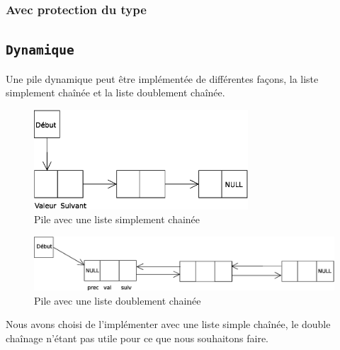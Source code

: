 \subsubsection{Avec protection du type}

\subsection{\texttt{Dynamique}}
Une pile dynamique peut être implémentée de différentes façons, la liste simplement chaînée et la liste doublement chaînée.
\begin{figure}[H]
\centering
\includegraphics[width=8cm]{content/schemas/pile.eps}
\caption{Pile avec une liste simplement chainée}
\end{figure}

\begin{figure}[H]
\centering
\includegraphics[width=16cm]{content/schemas/pileDoubleChaine.eps}
\caption{Pile avec une liste doublement chainée}
\end{figure}

Nous avons choisi de l'implémenter avec une liste simple chaînée, le double chaînage n'étant pas utile pour ce que nous souhaitons faire.


